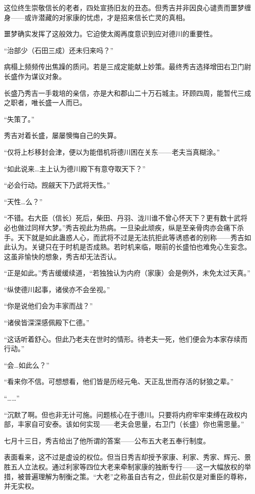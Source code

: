 \documentclass[
]{book}
\begin{document}
这位终生崇敬信长的老者，四处宣扬旧友的丑态。但秀吉并非因良心谴责而噩梦缠身------或许潜藏的对家康的忧虑，才是招来信长亡灵的真相。

噩梦确实发挥了这般效力。它迫使太阁再度意识到应对德川的重要性。

``治部少（石田三成）还未归来吗？''

病榻上频频传出焦躁的质问。若是三成定能献上妙策。最终秀吉选择增田右卫门尉长盛作为谋议对象。

长盛乃秀吉一手栽培的亲信，亦是大和郡山二十万石城主。环顾四周，能暂代三成之职者，唯长盛一人而已。

``失策了。''

秀吉对着长盛，屡屡懊悔自己的失算。

``仅将上杉移封会津，便以为能借机将德川困在关东------老夫当真糊涂。''

``如此说来\ldots 主上认为德川殿下有意夺取天下？''

``必会行动。觊觎天下乃武将天性。''

``天性\ldots 么？''

``不错。右大臣（信长）死后，柴田、丹羽、泷川谁不曾心怀天下？更有数十武将必也做过同样大梦。''秀吉视此为热病。一旦染此顽疾，纵是至亲骨肉亦会痛下杀手。天下就是如此蛊惑人心，而武将不过是无法抗拒此等诱惑者的别称------秀吉如此认为。关键只在于时机是否成熟。若时机来临，眼前的长盛怕也难免心生妄念。这虽非愉快的想象，秀吉却无法否认。

``正是如此。''秀吉缓缓续道，``若独独认为内府（家康）会是例外，未免太过天真。''

``纵使德川起事，诸侯亦不会坐视。''

``你是说他们会为丰家而战？''

``诸侯皆深深感佩殿下仁德。''

``这话听着舒心。但此乃老夫在世时的情形。待老夫一死，他们便会为本家存续而行动。''

``会\ldots 如此么？''

``看来你不信。可想想看，他们皆是历经元龟、天正乱世而存活的豺狼之辈。''

``\ldots\ldots{}''

``沉默了啊。但也非无计可施。问题核心在于德川。只要将内府牢牢束缚在政权内部，丰家自可安泰。该如何实现------老夫会思量，右卫门（长盛）你也需思量。''

七月十三日，秀吉给出了他所谓的答案------公布五大老五奉行制度。

表面看来，这不过是虚设的权位。但当日秀吉却授予家康、利家、秀家、辉元、景胜五人立法权。通过利家等四位大老来牵制家康的独断专行------这一大幅放权的举措，被普遍理解为制衡之策。``大老''之称虽自古有之，但此前仅是对重臣的尊称，并无实权。
\end{document}
